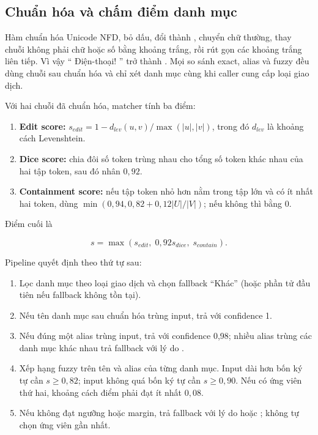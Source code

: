 \subsection{Chuẩn hóa và chấm điểm danh mục}

Hàm  chuẩn hóa Unicode NFD, bỏ dấu, đổi  thành , chuyển chữ thường, thay chuỗi không phải chữ hoặc số bằng khoảng trắng, rồi rút gọn các khoảng trắng liên tiếp. Vì vậy ``  Điện-thoại! '' trở thành . Mọi so sánh exact, alias và fuzzy đều dùng chuỗi sau chuẩn hóa và chỉ xét danh mục cùng  khi caller cung cấp loại giao dịch.

Với hai chuỗi đã chuẩn hóa, matcher tính ba điểm:

\begin{enumerate}
  \item \textbf{Edit score:} $s_{edit}=1-d_{lev}(u,v)/\max(|u|,|v|)$, trong đó $d_{lev}$ là khoảng cách Levenshtein.
  \item \textbf{Dice score:} chia đôi số token trùng nhau cho tổng số token khác nhau của hai tập token, sau đó nhân $0{,}92$.
  \item \textbf{Containment score:} nếu tập token nhỏ hơn nằm trong tập lớn và có ít nhất hai token, dùng $\min(0{,}94,0{,}82+0{,}12|U|/|V|)$; nếu không thì bằng 0.
\end{enumerate}

Điểm cuối là

\begin{equation}
  s=\max(s_{edit},\;0{,}92s_{dice},\;s_{contain}).
\end{equation}

Pipeline quyết định theo thứ tự sau:

\begin{enumerate}
  \item Lọc danh mục theo loại giao dịch và chọn fallback ``Khác'' (hoặc phần tử đầu tiên nếu fallback không tồn tại).
  \item Nếu tên danh mục sau chuẩn hóa trùng input, trả  với confidence 1.
  \item Nếu đúng một alias trùng input, trả  với confidence 0,98; nhiều alias trùng các danh mục khác nhau trả fallback với lý do .
  \item Xếp hạng fuzzy trên tên và alias của từng danh mục. Input dài hơn bốn ký tự cần $s\geq0{,}82$; input không quá bốn ký tự cần $s\geq0{,}90$. Nếu có ứng viên thứ hai, khoảng cách điểm phải đạt ít nhất $0{,}08$.
  \item Nếu không đạt ngưỡng hoặc margin, trả fallback với lý do  hoặc ; không tự chọn ứng viên gần nhất.
\end{enumerate}

